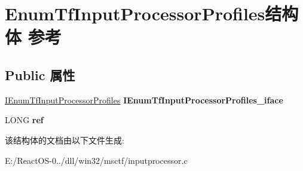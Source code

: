 \hypertarget{struct_enum_tf_input_processor_profiles}{}\section{Enum\+Tf\+Input\+Processor\+Profiles结构体 参考}
\label{struct_enum_tf_input_processor_profiles}
\subsection*{Public 属性}
\begin{DoxyCompactItemize}
\item 
\mbox{\label{struct_enum_tf_input_processor_profiles_a7ab3706615024ae375e232c7c79f7e40}} 
\hyperlink{interface_i_enum_tf_input_processor_profiles}{I\+Enum\+Tf\+Input\+Processor\+Profiles} {\bfseries I\+Enum\+Tf\+Input\+Processor\+Profiles\+\_\+iface}
\item 
\mbox{\label{struct_enum_tf_input_processor_profiles_a1d00164ff048db444965c44f13e17bcb}} 
L\+O\+NG {\bfseries ref}
\end{DoxyCompactItemize}


该结构体的文档由以下文件生成\+:\begin{DoxyCompactItemize}
\item 
E\+:/\+React\+O\+S-\/0../dll/win32/msctf/inputprocessor.\+c\end{DoxyCompactItemize}
